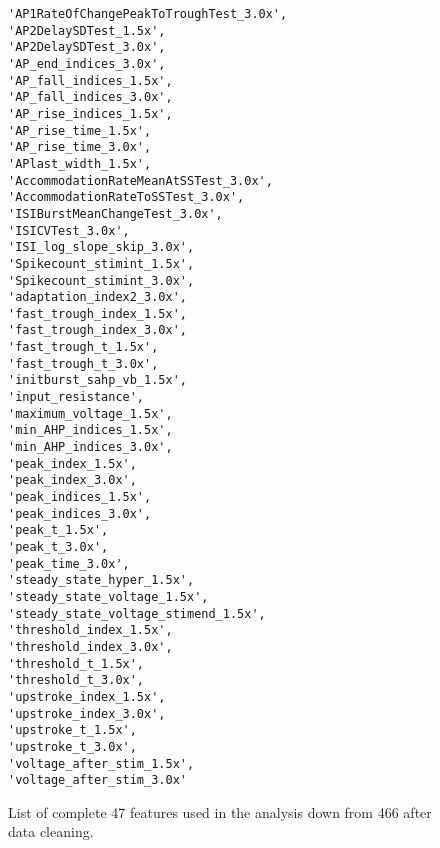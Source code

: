 \begin{figure}
\begin{verbatim}
'AP1RateOfChangePeakToTroughTest_3.0x',
'AP2DelaySDTest_1.5x',
'AP2DelaySDTest_3.0x',
'AP_end_indices_3.0x',
'AP_fall_indices_1.5x',
'AP_fall_indices_3.0x',
'AP_rise_indices_1.5x',
'AP_rise_time_1.5x',
'AP_rise_time_3.0x', 
'APlast_width_1.5x',
'AccommodationRateMeanAtSSTest_3.0x', 
'AccommodationRateToSSTest_3.0x',
'ISIBurstMeanChangeTest_3.0x', 
'ISICVTest_3.0x',
'ISI_log_slope_skip_3.0x', 
'Spikecount_stimint_1.5x',
'Spikecount_stimint_3.0x', 
'adaptation_index2_3.0x',
'fast_trough_index_1.5x', 
'fast_trough_index_3.0x',
'fast_trough_t_1.5x', 
'fast_trough_t_3.0x', 
'initburst_sahp_vb_1.5x',
'input_resistance', 
'maximum_voltage_1.5x', 
'min_AHP_indices_1.5x',
'min_AHP_indices_3.0x', 
'peak_index_1.5x', 
'peak_index_3.0x',
'peak_indices_1.5x', 
'peak_indices_3.0x',
'peak_t_1.5x',
'peak_t_3.0x',
'peak_time_3.0x',
'steady_state_hyper_1.5x',
'steady_state_voltage_1.5x', 
'steady_state_voltage_stimend_1.5x',
'threshold_index_1.5x', 
'threshold_index_3.0x',
'threshold_t_1.5x',
'threshold_t_3.0x',
'upstroke_index_1.5x',
'upstroke_index_3.0x',
'upstroke_t_1.5x', 
'upstroke_t_3.0x', 
'voltage_after_stim_1.5x',
'voltage_after_stim_3.0x'   
\end{verbatim}
\label{fig:reference_feature_list}
List of complete 47 features used in the analysis down from 466 after data cleaning.

\end{figure}

